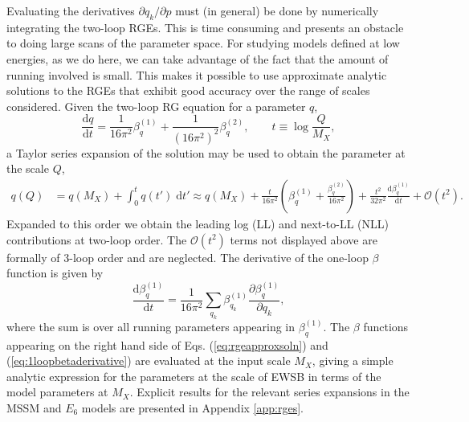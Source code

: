 \documentclass[preprint,amsmath,amssymb,aps,superscriptaddress,prd,showpacs,floatfix]{revtex4-1}
\begin{document}
Evaluating the derivatives $\partial q_k/\partial p$ must (in general) be done by numerically integrating the two-loop RGEs. This is time consuming and presents an obstacle to doing large scans of the parameter space. For studying models defined at low energies, as we do here, we can take advantage of the fact that the amount of running involved is small. This makes it possible to use approximate analytic solutions to the RGEs that exhibit good accuracy over the range of scales considered. Given the two-loop RG equation for a parameter $q$,
\begin{equation}\label{eq:rge}
\frac{\textrm{d}q}{\mathrm{d}t}=\frac{1}{16\pi^2}\beta_q^{(1)}+\frac{1}{(16\pi^2)^2}\beta_q^{(2)},\qquad t\equiv \log\frac{Q}{M_X},
\end{equation}
a Taylor series expansion of the solution may be used to obtain the parameter at the scale $Q$,
\begin{align}\label{eq:rgeapproxsoln}
q(Q)&=q(M_X)+\int_0^t q(t')\;\textrm{d}t'\approx q(M_X)+\frac{t}{16\pi^2}\left ( \beta_q^{(1)}+\frac{\beta_q^{(2)}}{16\pi^2}\right )+\frac{t^2}{32\pi^2}\frac{\textrm{d}\beta_q^{(1)}}{\textrm{d}t}+\mathcal{O}(t^2).
\end{align}
Expanded to this order we obtain the leading log (LL) and next-to-LL (NLL) contributions at two-loop order. The $\mathcal{O}(t^2)$ terms not displayed above are formally of 3-loop order and are neglected. The derivative of the one-loop $\beta$ function is given by
\begin{equation}\label{eq:1loopbetaderivative}
\frac{\textrm{d}\beta_q^{(1)}}{\textrm{d}t}=\frac{1}{16\pi^2}\sum_{q_k}\beta_{q_k}^{(1)}\frac{\partial \beta_q^{(1)}}{\partial q_k},
\end{equation}
where the sum is over all running parameters appearing in $\beta_q^{(1)}$. The $\beta$ functions appearing on the right hand side of Eqs. (\ref{eq:rgeapproxsoln}) and (\ref{eq:1loopbetaderivative}) are evaluated at the input scale $M_X$, giving a simple analytic expression for the parameters at the scale of EWSB in terms of the model parameters at $M_X$. Explicit results for the relevant series expansions in the MSSM and $E_6$ models are presented in Appendix \ref{app:rges}.
\end{document}
